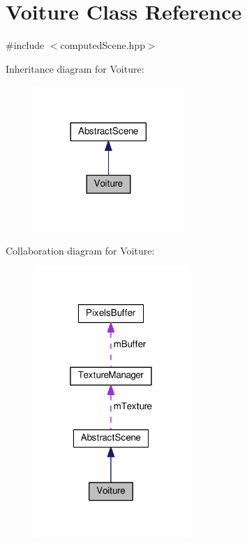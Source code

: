 \hypertarget{class_voiture}{\section{Voiture Class Reference}
\label{class_voiture}
}


{\ttfamily \#include $<$computed\+Scene.\+hpp$>$}



Inheritance diagram for Voiture\+:
\nopagebreak
\begin{figure}[H]
\begin{center}
\leavevmode
\includegraphics[width=161pt]{class_voiture__inherit__graph}
\end{center}
\end{figure}


Collaboration diagram for Voiture\+:
\nopagebreak
\begin{figure}[H]
\begin{center}
\leavevmode
\includegraphics[width=169pt]{class_voiture__coll__graph}
\end{center}
\end{figure}
